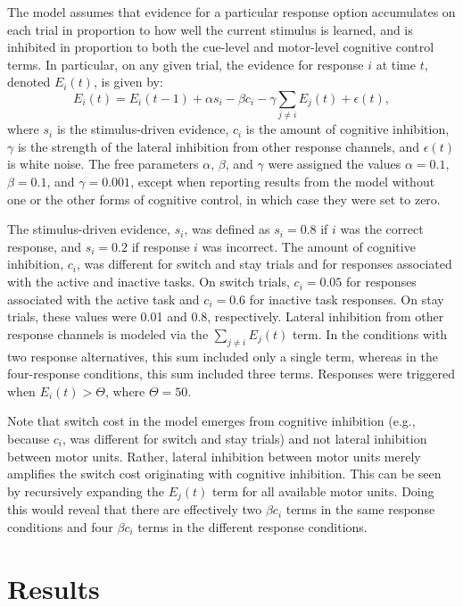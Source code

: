 \documentclass[doc, floatsintext]{apa7}
\begin{document}
The model assumes that evidence for a particular response
option accumulates on each trial in proportion to how well
the current stimulus is learned, and is inhibited in
proportion to both the cue-level and motor-level cognitive
control terms. In particular, on any given trial, the
evidence for response $i$ at time $t$, denoted  $E_i(t)$, is
given by:
\begin{equation}
    E_i(t) = E_i(t-1) + \alpha s_i - \beta c_i - \gamma \sum_{j \neq i} E_{j}(t) + \epsilon (t),
    \label{diffusion_model}
\end{equation}
where $s_i$ is the stimulus-driven evidence, $c_i$ is the
amount of cognitive inhibition, $\gamma$ is the strength of
the lateral inhibition from other response channels, and
$\epsilon (t)$ is white noise. The free parameters $\alpha$,
$\beta$, and $\gamma$ were assigned the values $\alpha=0.1$,
$\beta=0.1$, and $\gamma=0.001$, except when reporting
results from the model without one or the other forms of
cognitive control, in which case they were set to zero.

The stimulus-driven evidence, $s_i$, was defined as $s_i =
0.8$ if $i$ was the correct response, and $s_{i} = 0.2$ if
response $i$ was incorrect. The amount of cognitive
inhibition, $c_i$, was different for switch and stay trials
and for responses associated with the active and inactive
tasks. On switch trials, $c_i = 0.05$ for responses
associated with the active task and $c_i = 0.6$ for inactive
task responses. On stay trials, these values were 0.01 and
0.8, respectively. Lateral inhibition from other response
channels is modeled via the $\sum_{j \neq i} E_{j}(t)$ term.
In the conditions with two response alternatives, this sum
included only a single term, whereas in the four-response
conditions, this sum included three terms. Responses were
triggered when $E_i(t) > \Theta$, where $\Theta = 50$. 

Note that switch cost in the model emerges from cognitive
inhibition (e.g., because $c_i$, was different for switch
and stay trials) and not lateral inhibition between motor
units. Rather, lateral inhibition between motor units merely
amplifies the switch cost originating with cognitive
inhibition. This can be seen by recursively expanding the
$E_{j}(t)$ term for all available motor units. Doing this
would reveal that there are effectively two $\beta c_i$
terms in the same response conditions and four $\beta c_i$
terms in the different response conditions.

\section{Results}
\end{document}
